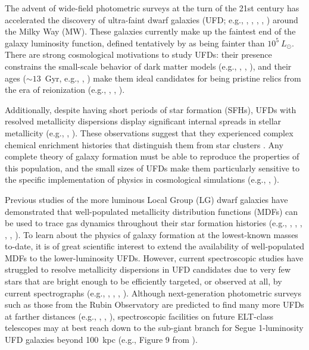 \documentclass[twocolumn]{aastex63}
\begin{document}
\par The advent of wide-field photometric surveys at the turn of the 21st century has accelerated the discovery of ultra-faint dwarf galaxies (UFD; e.g., \citealt{willman2005ufd}, \citealt{belokurov2007sdss}, \citealt{bechtol2015DESsat}, \citealt{koposov2015DESsat}, \citealt{laevens2015discovery}) around the Milky Way (MW). These galaxies currently make up the faintest end of the galaxy luminosity function, defined tentatively by \citet{simon2019review} as being fainter than $10^5~L_{\odot}$. There are strong cosmological motivations to study UFDs: their presence constrains the small-scale behavior of dark matter models (e.g., \citealt{bullock2017dmreview}, \citealt{nadler2021}, \citealt{kim2021}), and their ages ($\sim13$~Gyr, e.g., \citealt{brown2014sfh}, \citealt{weisz2014sfh}) make them ideal candidates for being pristine relics from the era of reionization (e.g., \citealt{bovill2009}, \citealt{blandhawthorn2015},  \citealt{weisz2017reionization}). 

\par Additionally, despite having short periods of star formation (SFHs), UFDs with resolved metallicity dispersions display significant internal spreads in stellar metallicity (e.g., \citealt{willman2011wil1},  \citealt{frebel2014segue1}). These observations suggest that they experienced complex chemical enrichment histories that distinguish them from star clusters \citep[e.g., ][]{willman2012galaxydefined}. Any complete theory of galaxy formation must be able to reproduce the properties of this population, and the small sizes of UFDs make them particularly sensitive to the specific implementation of physics in cosmological simulations (e.g., \citealt{munshi2019}, \citealt{agertz2020edge}).

\par Previous studies of the more luminous Local Group (LG) dwarf galaxies have demonstrated that well-populated metallicity distribution functions (MDFs) can be used to trace gas dynamics throughout their star formation histories (e.g., \citealt{tolstoy2009}, \citealt{kirby2011MDFs}, \citealt{kirby2013LZR}, \citealt{ross2015}, \citealt{kirby2017}, \citealt{jenkins2021vlt}). To learn about the physics of galaxy formation at the lowest-known masses to-date, it is of great scientific interest to extend the availability of well-populated MDFs to the lower-luminosity UFDs. However, current spectroscopic studies have struggled to resolve metallicity dispersions in UFD candidates due to very few stars that are bright enough to be efficiently targeted, or observed at all, by current spectrographs (e.g., \citealt{walker2016}, \citealt{martin2016}, \citealt{li2018carinas}, \citealt{simon2020ufds}). Although next-generation photometric surveys such as those from the Rubin Observatory are predicted to find many more UFDs at farther distances (e.g., \citealt{wheeler2019ufdsims}, \citealt{applebaum2021}, \citealt{mutlupatkdil2021}), spectroscopic facilities on future ELT-class telescopes may at best reach down to the sub-giant branch for Segue 1-luminosity UFD galaxies beyond 100~kpc (e.g., Figure 9 from \citealt{simon2019review}). 
\end{document}
